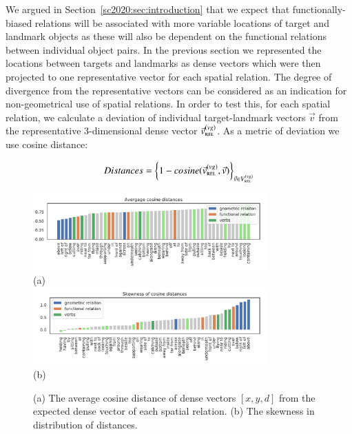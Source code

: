 We argued in Section~\ref{sc2020:sec:introduction} that we expect that
functionally-biased relations will be associated with more variable
locations of target and landmark objects as these will also be
dependent on the functional relations between individual object
pairs. In the previous section we represented the locations between
targets and landmarks as dense vectors which were then projected to
one representative vector for each spatial relation.
The degree of divergence from the representative vectors can be considered as an indication for non-geometrical use of spatial relations. 
In order to test this, for each spatial relation, we calculate a deviation of individual
target-landmark vectors $\vec{v}$ from the representative 3-dimensional dense vector $\vec{v}_{\textsc{rel}}^{(vg)}$.
As a metric of deviation we use cosine distance:

\begin{equation}\label{sc2020:eq:distances}
	Distances = \bigg\{ 1-cosine(\vec{v}_{\textsc{rel}}^{(vg)}, \vec{v}) \bigg\}_{\vec{v} \in V_{\textsc{rel}}^{(vg)}}
\end{equation}



\begin{figure}
	\centering
	\begin{minipage}{\textwidth}
		\centering
		\includegraphics[width=0.8\textwidth]{studies/sc2020/figures/avg_cosine_from_bbox_fun-geo+verbs.pdf}\\ (a) \\
		\includegraphics[width=0.8\textwidth]{studies/sc2020/figures/skewness_cosine_from_bbox_fun-geo+verbs.pdf} \\ (b)
	\end{minipage}%
	\caption{(a) The average cosine distance of dense vectors $[x, y, d]$ from the expected dense vector of each spatial relation. (b) The skewness in distribution of distances.} \label{sc2020:fig:variations}
\end{figure}





